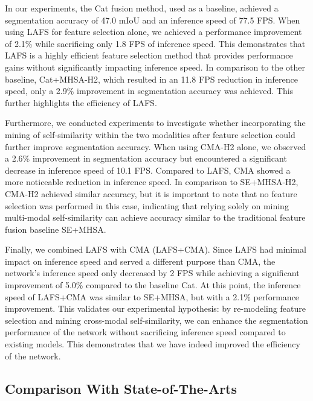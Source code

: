 \documentclass[letterpaper, 10 pt, conference]{ieeeconf}
\begin{document}
In our experiments, the Cat fusion method, used as a baseline, achieved a segmentation accuracy of 47.0 mIoU and an inference speed of 77.5 FPS. When using LAFS for feature selection alone, we achieved a performance improvement of 2.1\% while sacrificing only 1.8 FPS of inference speed. This demonstrates that LAFS is a highly efficient feature selection method that provides performance gains without significantly impacting inference speed. In comparison to the other baseline, Cat+MHSA-H2, which resulted in an 11.8 FPS reduction in inference speed, only a 2.9\% improvement in segmentation accuracy was achieved. This further highlights the efficiency of LAFS.

Furthermore, we conducted experiments to investigate whether incorporating the mining of self-similarity within the two modalities after feature selection could further improve segmentation accuracy. When using CMA-H2 alone, we observed a 2.6\% improvement in segmentation accuracy but encountered a significant decrease in inference speed of 10.1 FPS. Compared to LAFS, CMA showed a more noticeable reduction in inference speed. In comparison to SE+MHSA-H2, CMA-H2 achieved similar accuracy, but it is important to note that no feature selection was performed in this case, indicating that relying solely on mining multi-modal self-similarity can achieve accuracy similar to the traditional feature fusion baseline SE+MHSA.

Finally, we combined LAFS with CMA (LAFS+CMA). Since LAFS had minimal impact on inference speed and served a different purpose than CMA, the network's inference speed only decreased by 2 FPS while achieving a significant improvement of 5.0\% compared to the baseline Cat. At this point, the inference speed of LAFS+CMA was similar to SE+MHSA, but with a 2.1\% performance improvement. This validates our experimental hypothesis: by re-modeling feature selection and mining cross-modal self-similarity, we can enhance the segmentation performance of the network without sacrificing inference speed compared to existing models. This demonstrates that we have indeed improved the efficiency of the network.



\subsection{Comparison With State-of-The-Arts}
\end{document}
